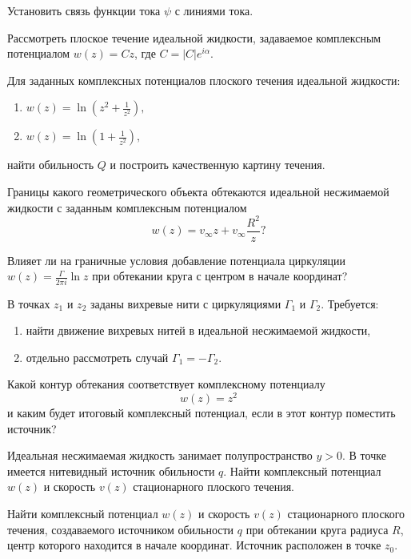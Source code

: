 \documentclass[14pt]{extarticle}
\begin{document}
\begin{problems}

	\item Установить связь функции тока  $\psi$ с линиями тока.

	\item Рассмотреть плоское течение идеальной жидкости, задаваемое комплексным потенциалом $w(z) = Cz$, где $C = |C| e^{i \alpha}$.

	\item Для заданных комплексных потенциалов плоского течения идеальной жидкости:
		\begin{enumerate}
			\item 
			$
				w(z) = \ln \left( z^2 + \displaystyle\frac{1}{z^2} \right),
			$
			\item 
			$ 
			w(z) = \ln \left( 1 + \displaystyle\frac{1}{z^2} \right),
			$
		\end{enumerate}
	найти обильность $Q$ и построить качественную картину течения.
	
	\item 
	Границы какого геометрического объекта обтекаются идеальной не\-сжи\-маемой жидкости с заданным комплексным потенциалом
	\[
		w(z)  = v_\infty z + v_\infty \frac{R^2}{z}?
	\]
	
	Влияет ли на граничные условия добавление потенциала циркуляции  $w(z) = \displaystyle\frac{\Gamma}{2 \pi i} \ln z$ при обтекании круга с центром в начале координат?
	
	
	\item В точках $z_1$ и $z_2$ заданы вихревые нити с циркуляциями $\Gamma_1$ и $\Gamma_2$. Требуется:
	\begin{enumerate}
		\item найти движение вихревых нитей в идеальной несжимаемой жидкости, 
		\item отдельно рассмотреть случай $\Gamma_1 = -\Gamma_2$.
	\end{enumerate}

	\item
	Какой контур обтекания соответствует комплексному потенциалу
	\[
	w(z) = z^2
	\]
	и каким будет итоговый комплексный потенциал, если в этот контур поместить источник?
	
	\item
	Идеальная несжимаемая жидкость занимает полупространство $y>0$. В точке  имеется нитевидный источник обильности $q$. Найти комплексный потенциал $w(z)$ и скорость $v(z)$ стационарного плоского течения.
	
	\item
	Найти комплексный потенциал $w(z)$ и скорость $v(z)$ стационарного плоского течения, создаваемого источником обильности $q$ при обтекании круга радиуса $R$, центр которого находится в начале координат. Источник расположен в точке $z_0$. 
	

\end{problems}
\end{document}
